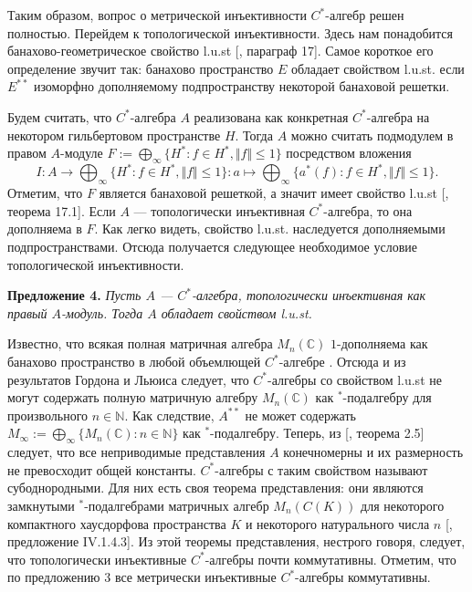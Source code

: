 \documentclass[12pt]{article}
\begin{document}
Таким образом, вопрос о метрической инъективности $C^*$-алгебр решен полностью. Перейдем к топологической инъективности. Здесь нам понадобится банахово-геометрическое свойство l.u.st [\cite{DiestAbsSumOps}, параграф 17]. Самое короткое его определение звучит так: банахово пространство $E$ обладает свойством l.u.st. если $E^{**}$ изоморфно дополняемому подпространству некоторой банаховой решетки. 

Будем считать, что $C^*$-алгебра $A$ реализована как конкретная $C^*$-алгебра на некотором гильбертовом пространстве $H$. Тогда $A$ можно считать подмодулем в правом $A$-модуле $F:=\bigoplus_\infty\{H^*:f\in H^*, \Vert f\Vert\leq 1\}$ посредством вложения
$$
I:A\to\bigoplus_\infty\{H^*:f\in H^*, \Vert f\Vert\leq 1\}:a\mapsto \bigoplus_\infty\{a^*(f):f\in H^*, \Vert f\Vert\leq 1\}.
$$
Отметим, что $F$ является банаховой решеткой, а значит имеет свойство l.u.st [\cite{DiestAbsSumOps}, теорема 17.1]. Если $A$ --- топологически инъективная $C^*$-алгебра, то она дополняема в $F$. Как легко видеть, свойство l.u.st. наследуется дополняемыми подпространствами. Отсюда получается следующее необходимое условие топологической инъективности. 

\medskip
\textbf{Предложение 4.} \textit{Пусть $A$ --- $C^*$-алгебра, топологически инъективная как правый $A$-модуль. Тогда $A$ обладает свойством l.u.st.}

\medskip
Известно, что всякая полная матричная алгебра $M_n(\mathbb{C})$ $1$-дополняема как банахово пространство в любой объемлющей $C^*$-алгебре \cite{LauLoyWillisAmnblOfBanAndCStarAlgsOfLCG}.
Отсюда и из результатов Гордона и Льюиса \cite{GorLewAbsSmOpAndLocUncondStrct} следует, что $C^*$-алгебры со свойством l.u.st не могут содержать полную матричную алгебру $M_n(\mathbb{C})$ как ${}^*$-подалгебру для произвольного $n\in\mathbb{N}$. Как следствие, $A^{**}$ не может содержать $M_\infty:=\bigoplus_\infty\{M_n(\mathbb{C}):n\in\mathbb{N}\}$ как ${}^*$-подалгебру. Теперь, из [\cite{LauLoyWillisAmnblOfBanAndCStarAlgsOfLCG}, теорема 2.5] следует, что все неприводимые представления $A$ конечномерны и их размерность не превосходит общей константы. $C^*$-алгебры с таким свойством называют субоднородными. Для них есть своя теорема представления: они являются замкнутыми ${}^*$-подалгебрами матричных алгебр $M_n(C(K))$ для некоторого компактного хаусдорфова пространства $K$ и некоторого натурального числа $n$ [\cite{BlackadarOpAlg}, предложение IV.1.4.3]. Из этой теоремы представления, нестрого говоря, следует, что топологически инъективные $C^*$-алгебры почти коммутативны. Отметим, что по предложению 3 все метрически инъективные $C^*$-алгебры коммутативны.
\end{document}
